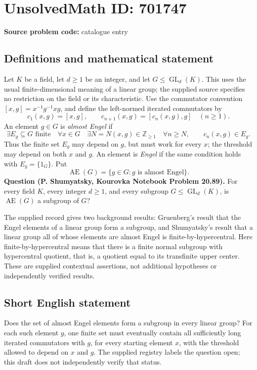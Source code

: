 \documentclass[11pt]{article}
\newcommand{\Z}{\mathbb{Z}}
\begin{document}
\section*{UnsolvedMath ID: 701747}
\textbf{Source problem code:} catalogue entry
\subsection{Definitions and mathematical statement}
Let \(K\) be a field, let \(d\geq 1\) be an integer, and let \(G\leq \operatorname{GL}_d(K)\). This uses the usual finite-dimensional meaning of a linear group; the supplied source specifies no restriction on the field or its characteristic. Use the commutator convention \([x,g]=x^{-1}g^{-1}xg\), and define the left-normed iterated commutators by
\[
c_1(x,g)=[x,g],\qquad c_{n+1}(x,g)=[c_n(x,g),g]\quad(n\geq 1).
\]
An element \(g\in G\) is \emph{almost Engel} if
\[
\exists E_g\subseteq G\text{ finite}\quad
\forall x\in G\quad
\exists N=N(x,g)\in\Z_{\geq 1}\quad
\forall n\geq N,\qquad c_n(x,g)\in E_g.
\]
Thus the finite set \(E_g\) may depend on \(g\), but must work for every \(x\); the threshold may depend on both \(x\) and \(g\). An element is \emph{Engel} if the same condition holds with \(E_g=\{1_G\}\). Put
\[
\operatorname{AE}(G)=\{g\in G:g\text{ is almost Engel}\}.
\]
\textbf{Question (P. Shumyatsky, Kourovka Notebook Problem 20.89).} For every field \(K\), every integer \(d\geq 1\), and every subgroup \(G\leq\operatorname{GL}_d(K)\), is \(\operatorname{AE}(G)\) a subgroup of \(G\)?

The supplied record gives two background results: Gruenberg's result that the Engel elements of a linear group form a subgroup, and Shumyatsky's result that a linear group all of whose elements are almost Engel is finite-by-hypercentral. Here finite-by-hypercentral means that there is a finite normal subgroup with hypercentral quotient, that is, a quotient equal to its transfinite upper center. These are supplied contextual assertions, not additional hypotheses or independently verified results.
\subsection{Short English statement}
Does the set of almost Engel elements form a subgroup in every linear group? For each such element \(g\), one finite set must eventually contain all sufficiently long iterated commutators with \(g\), for every starting element \(x\), with the threshold allowed to depend on \(x\) and \(g\). The supplied registry labels the question open; this draft does not independently verify that status.
\end{document}
